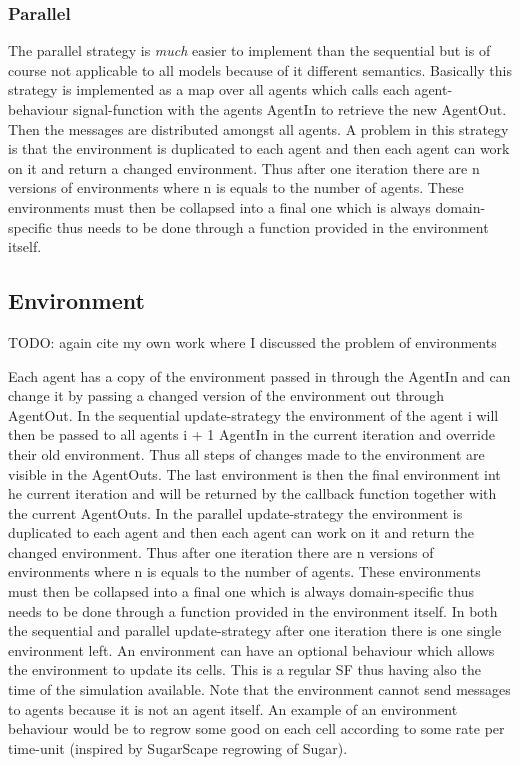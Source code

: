 \subsubsection{Parallel}
The parallel strategy is \textit{much} easier to implement than the sequential but is of course not applicable to all models because of it different semantics. Basically this strategy is implemented as a map over all agents which calls each agent-behaviour signal-function with the agents AgentIn to retrieve the new AgentOut. Then the messages are distributed amongst all agents.
A problem in this strategy is that the environment is duplicated to each agent and then each agent can work on it and return a changed environment. Thus after one iteration there are n versions of environments where n is equals to the number of agents. These environments must then be collapsed into a final one which is always domain-specific thus needs to be done through a function provided in the environment itself.


\subsection{Environment}
TODO: again cite my own work where I discussed the problem of environments

Each agent has a copy of the environment passed in through the AgentIn and can change it by passing a changed version of the environment out through AgentOut. 
In the sequential update-strategy the environment of the agent i will then be passed to all agents i + 1 AgentIn in the current iteration and override their old environment. Thus all steps of changes made to the environment are visible in the AgentOuts. The last environment is then the final environment int he current iteration and will be returned by the callback function together with the current AgentOuts.
In the parallel update-strategy the environment is duplicated to each agent and then each agent can work on it and return the changed environment. Thus after one iteration there are n versions of environments where n is equals to the number of agents. These environments must then be collapsed into a final one which is always domain-specific thus needs to be done through a function provided in the environment itself.
In both the sequential and parallel update-strategy after one iteration there is one single environment left. An environment can have an optional behaviour which allows the environment to update its cells. This is a regular SF thus having also the time of the simulation available. Note that the environment cannot send messages to agents because it is not an agent itself. An example of an environment behaviour would be to regrow some good on each cell according to some rate per time-unit (inspired by SugarScape regrowing of Sugar).

